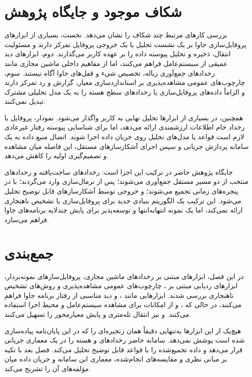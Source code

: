 \section{شکاف موجود و جایگاه پژوهش}
\label{sec:research-gap}

بررسی کارهای مرتبط چند شکاف را نشان می‌دهد. نخست، بسیاری از ابزارهای
پروفایل‌سازی جاوا بر یک نشست تحلیل یا یک خروجی پروفایل تمرکز دارند و
مسئولیت انتقال، ذخیره و تحلیل پیوسته داده را بر عهده کاربر می‌گذارند.
دوم، ابزارهای  دید عمیقی از سیستم‌عامل فراهم می‌کنند، اما از
مفاهیم داخلی ماشین مجازی مانند رخدادهای جمع‌آوری زباله، تخصیص شیء و
قفل‌های جاوا آگاه نیستند. سوم، چارچوب‌های عمومی مشاهده‌پذیری بر
استانداردسازی معیار، گزارش و رد تمرکز دارند و الزاماً داده‌های
پروفایل‌سازی یا رخدادهای سطح هسته را به یک مدل تحلیلی مشترک تبدیل
نمی‌کنند.

همچنین، در بسیاری از ابزارها تحلیل نهایی به کاربر واگذار می‌شود.
نمودار، پروفایل یا رخداد خام اطلاعات ارزشمندی ارائه می‌دهد، اما برای
شناسایی پیوسته رفتار غیرعادی لازم است قواعد یا مدل‌های تحلیل روی جریان
داده اجرا شوند. اتصال منبع داده به یک سامانه پردازش جریانی و سپس اجرای
آشکارسازهای مستقل، این فاصله میان مشاهده و تصمیم‌گیری اولیه را کاهش
می‌دهد.

جایگاه پژوهش حاضر در ترکیب این اجزا است: رخدادهای ساخت‌یافته
 و رخدادهای منتخب  از دو مسیر مستقل جمع‌آوری می‌شوند؛
پس از نرمال‌سازی وارد  می‌گردند؛ با  در
پنجره‌های زمانی تجمیع می‌شوند؛ و خروجی توسط آشکارسازهای قابل توضیح تحلیل
می‌شود. این ترکیب یک الگوریتم بنیادی جدید برای پروفایل‌سازی یا تشخیص
ناهنجاری ارائه نمی‌کند، اما یک نمونه انتهابه‌انتها و توسعه‌پذیر برای
پایش چندلایه برنامه‌های جاوا فراهم می‌سازد.

\section{جمع‌بندی}
\label{sec:related-work-summary}

در این فصل، ابزارهای مبتنی بر رخدادهای ماشین مجازی، پروفایل‌سازهای
نمونه‌بردار، ابزارهای ردیابی مبتنی بر ، چارچوب‌های عمومی
مشاهده‌پذیری و روش‌های تشخیص ناهنجاری بررسی شدند. ابزارهایی مانند
،  و  دید مناسبی از رفتار
برنامه جاوا فراهم می‌کنند، در حالی که ،  و
 از امکانات  برای مشاهده سیستم‌عامل و محیط اجرا
استفاده می‌کنند.  و  نیز انتقال
تله‌متری و پایش معیارمحور را تسهیل می‌کنند.

هیچ‌یک از این ابزارها به‌تنهایی دقیقاً همان زنجیره‌ای را که در این
پایان‌نامه پیاده‌سازی شده است پوشش نمی‌دهد. سامانه حاضر رخدادهای
 و هسته را در یک معماری جریانی قرار می‌دهد و داده تجمیع‌شده را
با قواعد قابل توضیح تحلیل می‌کند. فصل بعد با تکیه بر مبانی نظری و
مقایسه‌های انجام‌شده، معماری این سامانه و جریان داده میان مؤلفه‌های آن
را تشریح می‌کند.
